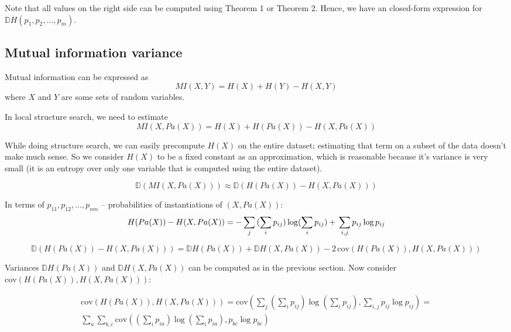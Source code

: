 \documentclass{article}
\begin{document}
Note that all values on the right side can be computed using Theorem 1 or Theorem 2. Hence, we have an closed-form expression for $\mathbb{D}H(p_1, p_2, \ldots, p_m)$.

\subsection{Mutual information variance}
Mutual information can be expressed as  
\begin{equation}
MI(X, Y) = H(X) + H(Y) - H(X, Y)
\end{equation}
where $X$ and $Y$ are some sets of random variables. 

In local structure search, we need to estimate
\begin{equation}
MI(X, Pa(X)) = H(X) + H(Pa(X)) - H(X, Pa(X))
\end{equation}

While doing structure search, we can easily precompute $H(X)$ on the entire dataset; estimating that term on a subset of the data doesn't make much sense. So we consider $H(X)$ to be a fixed constant as an approximation, which is reasonable because it's variance is very small (it is an entropy over only one variable that is computed using the entire dataset). 

\begin{equation*}
\mathbb{D}(MI(X, Pa(X))) \approx \mathbb{D}(H(Pa(X)) - H(X, Pa(X)))
\end{equation*}

In terms of $p_{11}, p_{12}, \ldots, p_{nm}$ -- probabilities of instantiations of $(X, Pa(X))$:
\begin{equation*}
H(Pa(X)) - H(X, Pa(X)) = -\sum_j{(\sum_i{p_{ij}}) \log(\sum_i{p_{ij}})} + \\ \sum_{i,j}{p_{ij} \log p_{ij}}
\end{equation*}

\begin{equation*}
\mathbb{D}(H(Pa(X)) - H(X, Pa(X))) = \mathbb{D}H(Pa(X)) + \mathbb{D}H(X, Pa(X)) - 2\,\mathrm{cov}(H(Pa(X)), H(X, Pa(X)))
\end{equation*}

Variances $\mathbb{D}H(Pa(X))$ and $\mathbb{D}H(X, Pa(X))$ can be computed as in the previous section. Now consider $\mathrm{cov}(H(Pa(X)), H(X, Pa(X)))$:

\begin{multline}
\mathrm{cov}(H(Pa(X)), H(X, Pa(X))) = \mathrm{cov}(\sum_j{(\sum_i{p_{ij}}) \log(\sum_i{p_{ij}})}, \sum_{i,j}{p_{ij} \log p_{ij}}) = 
\\ \sum_a \sum_{b,c} \mathrm{cov}((\sum_i{p_{ia}}) \log(\sum_i{p_{ia}}), p_{bc} \log p_{bc})
\end{multline}
\end{document}
